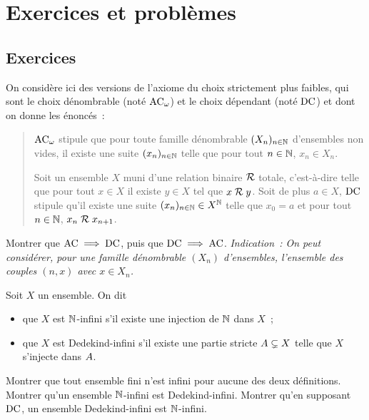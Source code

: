 \clearpage

\section{Exercices et problèmes}

\subsection{Exercices}

\begin{exercise}
  On considère ici des versions de l'axiome du choix strictement plus faibles,
  qui sont le choix dénombrable (noté $\operatorname{AC}_{\omega}$) et le choix dépendant
  (noté $\operatorname{DC}$) et dont on donne les énoncés~:
  \begin{quotation}
    $\operatorname{AC}_{\omega}$ stipule que pour toute famille dénombrable $(X_n)_{n \in \mathbb N}$
    d'ensembles non vides, il existe une suite $(x_n)_{n \in \mathbb N}$ telle que
    pour tout $n \in \mathbb N$, $x_n \in X_n$.

    Soit un ensemble $X$ muni d'une relation binaire $\mathrel{\mathcal{R}}$ totale,
    c'est-à-dire telle que pour tout $x \in X$ il existe $y \in X$ tel que
    $x\mathrel{\mathcal{R}} y$. Soit de plus $a \in X$, $\operatorname{DC}$ stipule qu'il existe une
    suite $(x_n)_{n \in \mathbb N} \in X^\mathbb N$ telle que $x_0 = a$ et pour tout
    $n \in \mathbb N$, $x_n \mathrel{\mathcal{R}} x_{n+1}$.
  \end{quotation}

  Montrer que $\operatorname{AC}\implies \operatorname{DC}$, puis que $\operatorname{DC}\implies \operatorname{AC}$.
  \textit{Indication~: On peut considérer, pour une famille dénombrable
    $(X_n)$ d'ensembles, l'ensemble des couples $(n,x)$ avec $x \in X_n$.}
\end{exercise}

\begin{exercise}
  Soit $X$ un ensemble. On dit
  \begin{itemize}
  \item que $X$ est $\mathbb N$-infini s'il existe une injection de $\mathbb N$ dans $X$~;
  \item que $X$ est Dedekind-infini s'il existe une partie stricte
    $A\subsetneq X$ telle que $X$ s'injecte dans $A$.
  \end{itemize}
  Montrer que tout ensemble fini n'est infini pour aucune des deux définitions.
  Montrer qu'un ensemble $\mathbb N$-infini est Dedekind-infini. Montrer qu'en
  supposant $\operatorname{DC}$, un ensemble Dedekind-infini est $\mathbb N$-infini.
\end{exercise}

